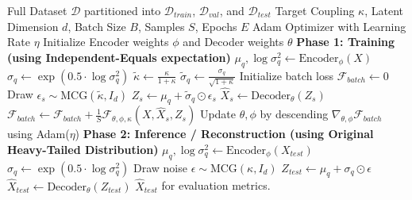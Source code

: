\documentclass[twoside,11pt]{article}
\begin{document}
\begin{algorithm}[H]
\caption{Coupled Variational Autoencoder (CVAE): Training and Inference}
\label{alg:cvae_training}
\small
\begin{algorithmic}[1]
\Require Full Dataset $\mathcal{D}$ partitioned into $\mathcal{D}_{train}$, $\mathcal{D}_{val}$, and $\mathcal{D}_{test}$
\Require Target Coupling $\kappa$, Latent Dimension $d$, Batch Size $B$, Samples $S$, Epochs $E$
\Require Adam Optimizer with Learning Rate $\eta$
\State Initialize Encoder weights $\phi$ and Decoder weights $\theta$
\Statex
\State \textbf{Phase 1: Training (using Independent-Equals expectation)}
        \State $\mu_q, \log\sigma_q^2 \leftarrow \text{Encoder}_\phi(X)$
        \State $\sigma_q \leftarrow \exp(0.5 \cdot \log\sigma_q^2)$
        \Statex
        \State {}
        \State $\tilde{\kappa} \leftarrow \frac{\kappa}{1+\kappa}$
        \State $\tilde{\sigma}_q \leftarrow \frac{\sigma_q}{\sqrt{1+\kappa}}$
        \Statex
        \State Initialize batch loss $\mathcal{F}_{batch} \leftarrow 0$
        \State {}
            \State {}
            \State Draw $\epsilon_s \sim \text{MCG}(\tilde{\kappa}, I_d)$ 
            \State $Z_s \leftarrow \mu_q + \tilde{\sigma}_q \odot \epsilon_s$
            \State $\hat{X}_s \leftarrow \text{Decoder}_\theta(Z_s)$
            \Statex
            \State {}
            \State $\mathcal{F}_{batch} \leftarrow \mathcal{F}_{batch} + \frac{1}{S} \mathcal{F}_{\theta, \phi, \kappa}(X, \hat{X}_s, Z_s)$
        \EndFor
        \Statex
        \State {}
        \State Update $\theta, \phi$ by descending $\nabla_{\theta, \phi} \mathcal{F}_{batch}$ using Adam($\eta$)
    \EndFor
\EndFor
\Statex
\State \textbf{Phase 2: Inference / Reconstruction (using Original Heavy-Tailed Distribution)}
    \State $\mu_q, \log\sigma_q^2 \leftarrow \text{Encoder}_\phi(X_{test})$
    \State $\sigma_q \leftarrow \exp(0.5 \cdot \log\sigma_q^2)$
    \Statex
    \State {}
    \State {}
    \State Draw noise $\epsilon \sim \text{MCG}(\kappa, I_d)$
    \State $Z_{test} \leftarrow \mu_q + \sigma_q \odot \epsilon$
    \State $\hat{X}_{test} \leftarrow \text{Decoder}_\theta(Z_{test})$
    \State \Return $\hat{X}_{test}$ for evaluation metrics.
\EndFor
\end{algorithmic}
\end{algorithm}
\end{document}
